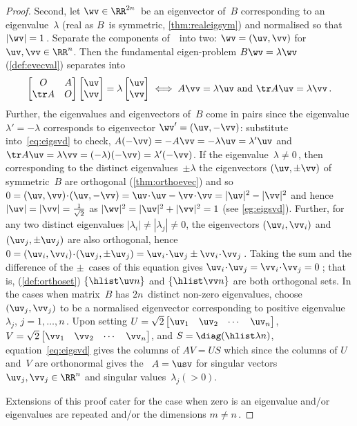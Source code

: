 \begin{proof}
Second, let \(\wv\in\RR^{2n}\)\ be an eigenvector of~\(B\) corresponding to an eigenvalue~\(\lambda\) (real as \(B\)~is symmetric, \autoref{thm:realeigsym}) and normalised so that \(|\wv|=1\)\,.
Separate the components of~\wv\ into two: \(\wv=(\uv,\vv)\) for \(\uv,\vv\in\RR^n\).
Then the fundamental eigen-problem \(B\wv=\lambda\wv\)  (\autoref{def:evecval}) separates into
\begin{equation}
\begin{bmatrix} O& A\\\tr A&O \end{bmatrix}\begin{bmatrix} \uv\\\vv \end{bmatrix}=\lambda\begin{bmatrix} \uv\\\vv \end{bmatrix}
\iff  A\vv=\lambda\uv \text{ and }\tr A\uv=\lambda\vv\,.
\label{eq:eigsvd}
\end{equation}
Further, the eigenvalues and eigenvectors of~\(B\) come in pairs since the eigenvalue \(\lambda'=-\lambda\) corresponds to eigenvector \(\wv'=(\uv,-\vv)\): substitute into~\eqref{eq:eigsvd} to check, \(A(-\vv)=-A\vv=-\lambda\uv=\lambda'\uv\) and \(\tr A\uv=\lambda\vv=(-\lambda)(-\vv)=\lambda'(-\vv)\).
If the eigenvalue~\(\lambda\neq0\)\,, then corresponding to the distinct eigenvalues~\(\pm\lambda\) the eigenvectors \((\uv,\pm\vv)\) of symmetric~\(B\) are orthogonal (\autoref{thm:orthoevec}) and so \(0=(\uv,\vv)\cdot(\uv,-\vv)=\uv\cdot\uv-\vv\cdot\vv=|\uv|^2-|\vv|^2\) and hence \(|\uv|=|\vv|=\frac1{\sqrt2}\) as \(|\wv|^2=|\uv|^2+|\vv|^2=1\) (see \autoref{eg:eigsvd}).
Further, for any two distinct eigenvalues \(|\lambda_i|\neq|\lambda_j|\neq 0\), the eigenvectors \((\uv_i,\vv_i)\) and \((\uv_j,\pm\uv_j)\) are also orthogonal, hence \(0 =(\uv_i,\vv_i)\cdot(\uv_j,\pm\uv_j) =\uv_i\cdot\uv_j \pm\vv_i\cdot\vv_j\)\,.
Taking the sum and the difference of the \(\pm\)~cases of this equation gives \(\uv_i\cdot\uv_j=\vv_i\cdot\vv_j=0\)\,; that is,  (\autoref{def:orthoset}) \(\{\hlist\uv n\}\) and \(\{\hlist\vv n\}\) are both orthogonal sets.
In the cases when matrix~\(B\) has \(2n\)~distinct non-zero eigenvalues, choose \((\uv_j,\vv_j)\) to be a normalised eigenvector corresponding to positive eigenvalue~\(\lambda_j\), \(j=1,\ldots,n\)\,. 
Upon setting \(U=\sqrt2\begin{bmatrix} \uv_1&\uv_2&\cdots&\uv_n \end{bmatrix}\), \(V=\sqrt2\begin{bmatrix} \vv_1&\vv_2&\cdots&\vv_n \end{bmatrix}\), and \(S=\diag(\hlist\lambda n)\), equation~\eqref{eq:eigsvd} gives the columns of \(AV=US\) which since the columns of \(U\) and~\(V\) are orthonormal gives the \svd\ \(A=\usv\) for singular vectors \(\uv_j,\vv_j\in\RR^n\) and singular values~\(\lambda_j(>0)\).

Extensions of this proof cater for the case when zero is an eigenvalue and/or eigenvalues are repeated and/or the dimensions \(m\neq n\)\,.
\end{proof}
